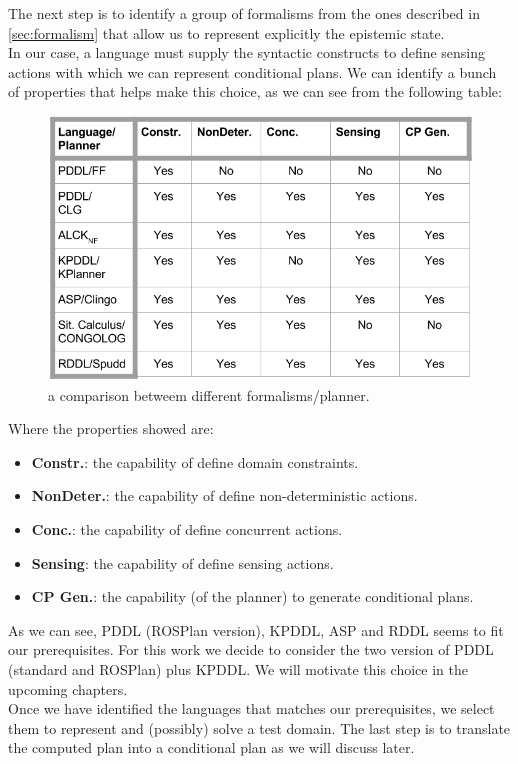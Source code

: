 \documentclass[pdftex,12pt,a4paper]{report}
\begin{document}
\noindent The next step is to identify a group of formalisms from the ones described in \ref{sec:formalism} that allow us to represent explicitly the epistemic state.\\
In our case, a language must supply the syntactic constructs to define sensing actions with which we can represent conditional plans.
We can identify a bunch of properties that helps make this choice, as we can see from the following table:
\begin{figure}[H]
	\centering
	\includegraphics[scale=0.4,trim=30mm 0mm 0mm 0mm]{images/formalisms.png}
	\caption{a comparison betweem different formalisms/planner.}
	\label{fig:formalisms}
\end{figure}
Where the properties showed are:
\begin{itemize}
\item \textbf{Constr.}: the capability of define domain constraints.
\item \textbf{NonDeter.}: the capability of define non-deterministic actions.
\item \textbf{Conc.}: the capability of define concurrent actions.
\item \textbf{Sensing}: the capability of define sensing actions.
\item \textbf{CP Gen.}: the capability (of the planner) to generate conditional plans.
\end{itemize}
\noindent As we can see, PDDL (ROSPlan version), KPDDL, ASP and RDDL seems to fit our prerequisites. For this work we decide to consider the two version of PDDL (standard and ROSPlan) plus KPDDL. We will motivate this choice in the upcoming chapters.\\
\noindent Once we have identified the languages that matches our prerequisites, we select them to represent and (possibly) solve a test domain. The last step is to translate the computed plan into a conditional plan as we will discuss later.\\
\end{document}
